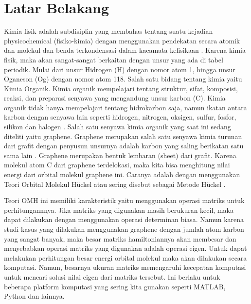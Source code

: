 \documentclass[12pt,a4paper]{report}
\begin{document}
\renewcommand{\thesection}{\arabic{chapter}.\arabic{section}}
\renewcommand{\thefigure}{\arabic{chapter}.\arabic{figure}}
\renewcommand{\thetable}{\arabic{chapter}.\arabic{table}}
\renewcommand{\theequation}{\arabic{chapter}.\arabic{equation}}
	\section{Latar Belakang}
	Kimia fisik adalah subdisiplin yang membahas tentang suatu kejadian physicochemical (fisiko-kimia) dengan menggunakan pendekatan secara atomik dan molekul dan benda terkondensasi dalam kacamata kefisikaan \cite{Slater1939}. Karena kimia fisik, maka akan sangat-sangat berkaitan dengan unsur yang ada di tabel periodik. Mulai dari unsur Hidrogen (H) dengan nomor atom 1, hingga unsur Oganeson (Og) dengan nomor atom 118. Salah satu bidang tentang kimia yaitu Kimia Organik. Kimia organik mempelajari tentang struktur, sifat, komposisi, reaksi, dan preparasi senyawa yang mengandung unsur karbon (C). Kimia organik tidak hanya mempelajari tentang hidrokarbon saja, namun ikatan antara karbon dengan senyawa lain seperti hidrogen, nitrogen, oksigen, sulfur, fosfor, silikon dan halogen \cite{ACS2020}. Salah satu senyawa kimia organik yang saat ini sedang diteliti yaitu graphene. Graphene merupakan salah satu senyawa kimia turunan dari grafit dengan penyusun unsurnya adalah karbon yang saling berikatan satu sama lain \cite{Zhen2017}. Graphene merupakan bentuk lembaran (sheet) dari grafit. Karena molekul atom C dari graphene terdelokasi, maka kita bisa menghitung nilai energi dari orbital molekul graphene ini. Caranya adalah dengan menggunakan Teori Orbital Molekul Hückel atau sering disebut sebagai Metode Hückel \cite{Ribeiro}.  
	
	Teori OMH ini memiliki karakteristik yaitu menggunakan operasi matriks untuk perhitungannnya. Jika matriks yang digunakan masih berukuran kecil, maka dapat dilakukan dengan menggunakan operasi determinan biasa. Namun karena studi kasus yang dilakukan menggunakan graphene dengan jumlah atom karbon yang sangat banyak, maka besar matriks hamiltoniannya akan membesar dan menyebabkan operasi matriks yang digunakan adalah operasi eigen. Untuk dapat melakukan perhitungan besar energi orbital molekul maka akan dilakukan secara komputasi. Namun, besarnya ukuran matriks memengaruhi kecepatan komputasi untuk mencari solusi nilai eigen dari matriks tersebut. Ini berlaku untuk beberapa platform komputasi yang sering kita gunakan seperti MATLAB, Python dan lainnya.  
	
\end{document}
